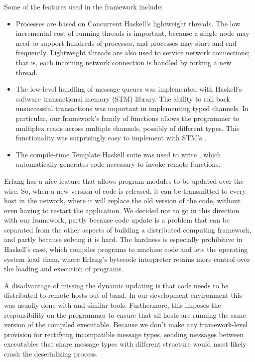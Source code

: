 \documentclass[preprint]{sigplanconf}
\begin{document}
Some of the features used in the framework include:

\begin{itemize}
\item Processes are based on Concurrent Haskell's lightweight threads. The low incremental cost of running threads is important, because a single node may need to support hundreds of processes, and processes may start and end frequently. Lightweight threads are also used to service network connections; that is, each incoming network connection is handled by forking a new thread.
\item The low-level handling of message queues was implemented with Haskell's software transactional memory (STM) library. The ability to roll back unsuccessful transactions was important in implementing typed channels. In particular, our framework's  family of functions allows the programmer to multiplex reads across multiple channels, possibly of different types. This functionality was surprisingly easy to implement with STM's .
\item The compile-time Template Haskell suite was used to write , which automatically generates code necessary to invoke remote functions.
\end{itemize}

Erlang has a nice feature that allows program modules to be updated over the wire. So, when a new version of code is released, it can be transmitted to every host in the network, where it will replace the old version of the code, without even having to restart the application. We decided not to go in this direction with our framework, partly because code update is a problem that can be separated from the other aspects of building a distributed computing framework, and partly because solving it is hard. The hardness is especially prohibitive in Haskell's case, which compiles programs to machine code and lets the operating system load them, where Erlang's bytecode interpreter retains more control over the loading and execution of programs.

A disadvantage of missing the dynamic updating is that code needs to be distributed to remote hosts out of band. In our development environment this was usually done with  and similar tools. Furthermore, this imposes the responsibility on the programmer to ensure that all hosts are running the same version of the compiled executable. Because we don't make any framework-level provision for rectifying incompatible message types, sending messages between executables that share message types with different structure would most likely crash the deserializing process.
\end{document}
